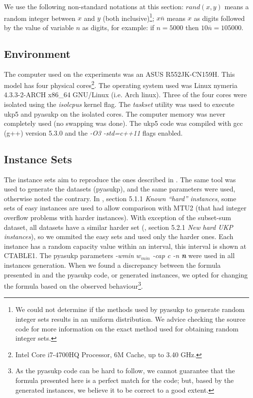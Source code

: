 \documentclass[runningheads,a4paper]{llncs}
\begin{document}
We use the following non-standard notations at this section: \(rand(x, y)\) means a random integer between \(x\) and \(y\) (both inclusive)\footnote{We could not determine if the methods used by pyasukp to generate random integer sets results in an uniform distribution. We advice checking the source code for more information on the exact method used for obtaining random integer sets.}; \(x\overline{n}\) means \(x\) as digits followed by the value of variable \(n\) as digits, for example: if \(n = 5000\) then \(10\overline{n} = 105000\).

\subsection{Environment}

The computer used on the experiments was an ASUS R552JK-CN159H. This model has four physical cores\footnote{Intel Core i7-4700HQ Processor, 6M Cache, up to 3.40 GHz.}. The operating system used was Linux nymeria 4.3.3-2-ARCH x86\_64 GNU/Linux (i.e. Arch linux). Three of the four cores were isolated using the \emph{isolcpus} kernel flag. The \emph{taskset} utility was used to execute ukp5 and pyasukp on the isolated cores. The computer memory was never completely used (no swapping was done). The ukp5 code was compiled with gcc (g++) version 5.3.0 and the \emph{-O3 -std=c++11} flags enabled.

\subsection{Instance Sets}

The instance sets aim to reproduce the ones described in \cite{CPYA}. The same tool was used to generate the datasets (pyasukp), and the same parameters were used, otherwise noted the contrary. In \cite{CPYA}, section 5.1.1 \emph{Known ``hard'' instances}, some sets of easy instances are used to allow comparison with MTU2 (that had integer overflow problems with harder instances). With exception of the subset-sum dataset, all datasets have a similar harder set (\cite{CPYA}, section 5.2.1 \emph{New hard UKP instances}), so we ommited the easy sets and used only the harder ones. Each instance has a random capacity value within an interval, this interval is shown at CTABLE1. The pyasukp parameters \emph{-wmin \(w_{min}\) -cap c -n \textbf{n}} were used in all instances generation. When we found a discrepancy between the formula presented in \cite{CPYA} and the pyasukp code, or generated instances, we opted for changing the formula based on the observed behaviour\footnote{As the pyasukp code can be hard to follow, we cannot guarantee that the formula presented here is a perfect match for the code; but, based by the generated instances, we believe it to be correct to a good extent.}.
\end{document}
